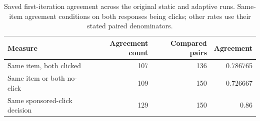 \begin{table}[htbp!]
\centering
\small
\setlength{\tabcolsep}{3pt}
\renewcommand{\arraystretch}{1.1}
\begin{tabular}{lrrr}
\hline
Measure & Agreement count & Compared pairs & Agreement \\
\hline
Same item, both clicked & 107 & 136 & 0.786765 \\
Same item or both no-click & 109 & 150 & 0.726667 \\
Same sponsored-click decision & 129 & 150 & 0.86 \\
\hline
\end{tabular}
\caption{Saved first-iteration agreement across the original static and adaptive runs. Same-item agreement conditions on both responses being clicks; other rates use their stated paired denominators.}
\label{chap:results:tab:rq1_spike_agreement}
\end{table}
